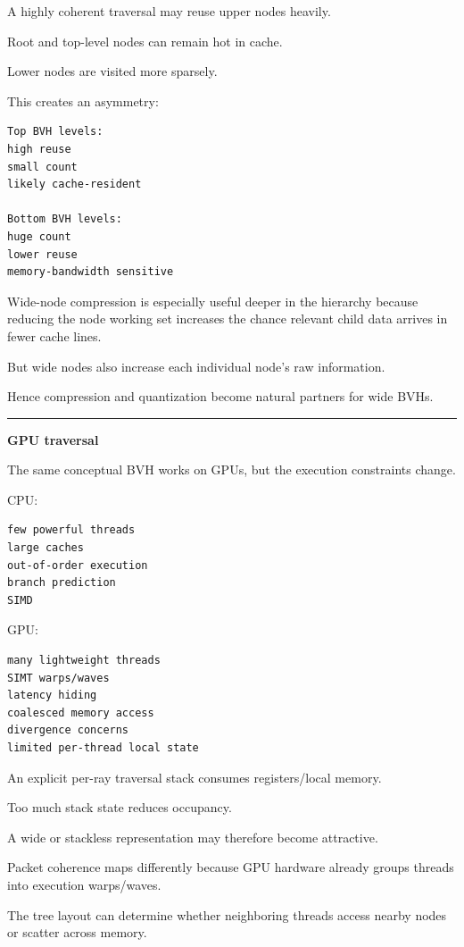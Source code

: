 A highly coherent traversal may reuse upper nodes heavily.

Root and top-level nodes can remain hot in cache.

Lower nodes are visited more sparsely.

This creates an asymmetry:

\begin{verbatim}
Top BVH levels:
high reuse
small count
likely cache-resident

Bottom BVH levels:
huge count
lower reuse
memory-bandwidth sensitive
\end{verbatim}

Wide-node compression is especially useful deeper in the hierarchy because reducing the node working set increases the chance relevant child data arrives in fewer cache lines.

But wide nodes also increase each individual node's raw information.

Hence compression and quantization become natural partners for wide BVHs.

\begin{center}\rule{0.5\linewidth}{0.5pt}\end{center}

\textbf{GPU traversal}

The same conceptual BVH works on GPUs, but the execution constraints change.

CPU:

\begin{verbatim}
few powerful threads
large caches
out-of-order execution
branch prediction
SIMD
\end{verbatim}

GPU:

\begin{verbatim}
many lightweight threads
SIMT warps/waves
latency hiding
coalesced memory access
divergence concerns
limited per-thread local state
\end{verbatim}

An explicit per-ray traversal stack consumes registers/local memory.

Too much stack state reduces occupancy.

A wide or stackless representation may therefore become attractive.

Packet coherence maps differently because GPU hardware already groups threads into execution warps/waves.

The tree layout can determine whether neighboring threads access nearby nodes or scatter across memory.

